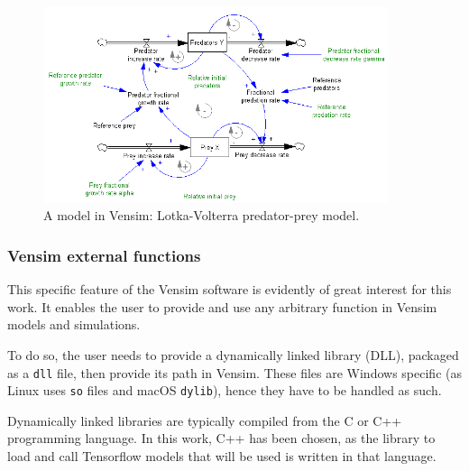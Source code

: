 \begin{figure}[h!]
    \includegraphics[width=0.9\textwidth]{resources/images/vensim-model-example.png}
    \caption{A model in Vensim: Lotka-Volterra predator-prey model.}
    \label{fig:vensim-model-example}
\end{figure}

\subsubsection{Vensim external functions}

This specific feature of the Vensim software is evidently of great interest for this work. It enables the user to provide and use any arbitrary function in Vensim models and simulations.

To do so, the user needs to provide a dynamically linked library (DLL), packaged as a \texttt{dll} file, then provide its path in Vensim. These files are Windows specific (as Linux uses \texttt{so} files and macOS \texttt{dylib}), hence they have to be handled as such.

Dynamically linked libraries are typically compiled from the C or C++ programming language. In this work, C++ has been chosen, as the library to load and call Tensorflow models that will be used is written in that language.

